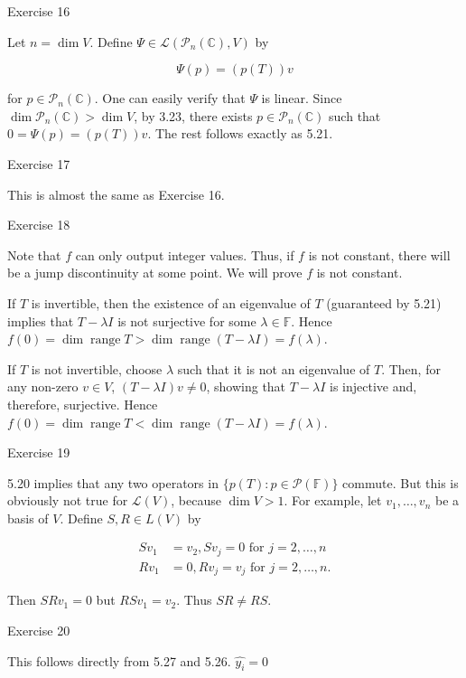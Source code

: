 \documentclass{article}
\begin{document}
Exercise 16

Let $n = \operatorname{dim} V$. Define $\Psi \in \mathcal{L}(\mathcal{P}_n(\mathbb{C}), V)$ by

$$ \Psi(p) = (p(T))v $$\label{key}

for $p \in \mathcal{P}_n(\mathbb{C})$. One can easily verify that $\Psi$ is linear. Since $\operatorname{dim} \mathcal{P}_n(\mathbb{C}) > \operatorname{dim} V$, by 3.23, there exists $p \in \mathcal{P}_n(\mathbb{C})$ such that $0 = \Psi(p) = (p(T))v$. The rest follows exactly as 5.21.

Exercise 17

This is almost the same as Exercise 16.

Exercise 18

Note that $f$ can only output integer values. Thus, if $f$ is not constant, there will be a jump discontinuity at some point. We will prove $f$ is not constant.

If $T$ is invertible, then the existence of an eigenvalue of $T$ (guaranteed by 5.21) implies that $T - \lambda I$ is not surjective for some $\lambda \in \mathbb{F}$. Hence $f(0) = \operatorname{dim} \operatorname{range} T > \operatorname{dim} \operatorname{range} (T - \lambda I) = f(\lambda)$.

If $T$ is not invertible, choose $\lambda$ such that it is not an eigenvalue of $T$. Then, for any non-zero $v \in V$, $(T - \lambda I)v \neq 0$, showing that $T - \lambda I$ is injective and, therefore, surjective. Hence $f(0) = \operatorname{dim} \operatorname{range} T < \operatorname{dim} \operatorname{range} (T - \lambda I) = f(\lambda)$.

Exercise 19

5.20 implies that any two operators in $\{p(T): p \in \mathcal{P}(\mathbb{F})\}$ commute. But this is obviously not true for $\mathcal{L}(V)$, because $\operatorname{dim} V > 1$. For example, let $v_1, \dots, v_n$ be a basis of $V$. Define $S, R \in L(V)$ by

$$ \begin{aligned} Sv_1 &= v_2, Sv_j = 0 \text{ for } j = 2, \dots, n\\ Rv_1 &= 0, Rv_j = v_j \text{ for } j = 2, \dots, n. \end{aligned} $$

Then $SRv_1 = 0$ but $RSv_1 = v_2$. Thus $SR \neq RS$.

Exercise 20

This follows directly from 5.27 and 5.26.
$\hat{y_i}=0$
\end{document}
